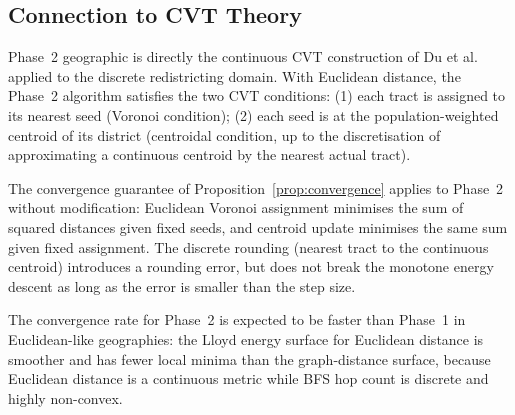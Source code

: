 \subsection{Connection to CVT Theory}

Phase~2 geographic \cvd{} is directly the continuous CVT construction of
Du et al.~\citeyear{du1999} applied to the discrete redistricting domain.
With Euclidean distance, the Phase~2 algorithm satisfies the two CVT conditions:
(1) each tract is assigned to its nearest seed (Voronoi condition);
(2) each seed is at the population-weighted centroid of its district
(centroidal condition, up to the discretisation of approximating a continuous
centroid by the nearest actual tract).

The convergence guarantee of Proposition~\ref{prop:convergence} applies to
Phase~2 without modification: Euclidean Voronoi assignment minimises the sum
of squared distances given fixed seeds, and centroid update minimises the same
sum given fixed assignment.
The discrete rounding (nearest tract to the continuous centroid) introduces
a rounding error, but does not break the monotone energy descent as long as
the error is smaller than the step size.

The convergence rate for Phase~2 is expected to be faster than Phase~1 in
Euclidean-like geographies: the Lloyd energy surface for Euclidean distance
is smoother and has fewer local minima than the graph-distance surface,
because Euclidean distance is a continuous metric while BFS hop count is
discrete and highly non-convex.
